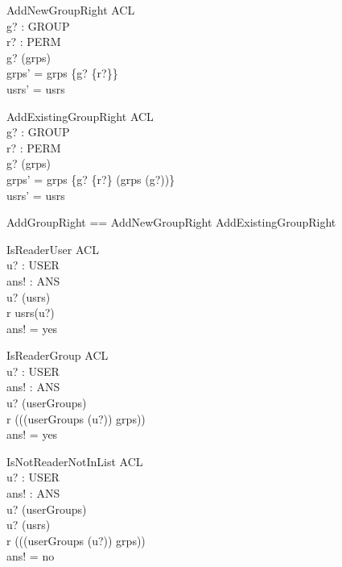 \begin{schema}{AddNewGroupRight}
\Delta ACL \\
g? : GROUP \\ 
r? : PERM \\
\where 
g? \notin \dom (grps) \\
grps' = grps \oplus \{g? \mapsto \{r?\}\} \\
usrs' = usrs
\end{schema}

\begin{schema}{AddExistingGroupRight}
\Delta ACL \\
g? : GROUP \\ 
r? : PERM \\
\where 
g? \in \dom (grps) \\
grps' = grps \oplus \{g? \mapsto \{r?\} \cup (grps (g?))\} \\
usrs' = usrs
\end{schema}

\begin{zed}
AddGroupRight == AddNewGroupRight \lor AddExistingGroupRight
\end{zed}

\begin{schema}{IsReaderUser}
\Xi ACL \\
u? : USER \\
ans! : ANS \\
\where
u? \in \dom (usrs) \\ 
r \in usrs(u?) \\
ans! = yes
\end{schema}

\begin{schema}{IsReaderGroup}
\Xi ACL \\
u? : USER \\
ans! : ANS \\
\where
u? \in \dom (userGroups) \\ 
r \in \bigcup (\ran((userGroups (u?)) \dres grps)) \\
ans! = yes
\end{schema}

\begin{schema}{IsNotReaderNotInList} 
\Xi ACL \\
u? : USER \\
ans! : ANS \\
\where 
u? \in \dom (userGroups) \\ 
u? \notin \dom (usrs) \\
r \notin \bigcup (\ran((userGroups (u?)) \dres grps)) \\
ans! = no
\end{schema}


